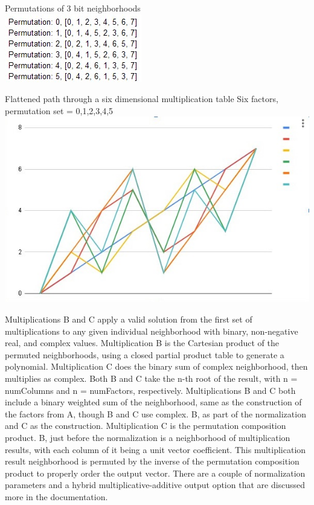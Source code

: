 \documentclass[11pt]{article}
\begin{document}
\begin{center}
Permutations of 3 bit neighborhoods\\
\includegraphics{bitPermutations.jpg}

Flattened path through a six dimensional multiplication table
Six factors, permutation set = {0,1,2,3,4,5}\\
\includegraphics{flattenedSixCube.jpg}
\end{center}

Multiplications B and C apply a valid solution from the first set of multiplications to any given individual neighborhood with binary, non-negative real, and complex values. Multiplication B is the Cartesian product of the permuted neighborhoods, using a closed partial product table to generate a polynomial. Multiplication C does the binary sum of complex neighborhood, then multiplies as complex. Both B and C take the n-th root of the result, with n = numColumns and n = numFactors, respectively. Multiplications B and C both include a binary weighted sum of the neighborhood, same as the construction of the factors from A, though B and C use complex. B, as part of the normalization and C as the construction. Multiplication C is the permutation composition product. B, just before the normalization is a neighborhood of multiplication results, with each column of it being a unit vector coefficient. This multiplication result neighborhood is permuted by the inverse of the permutation composition product to properly order the output vector. There are a couple of normalization parameters and a hybrid multiplicative-additive output option that are discussed more in the documentation.
\end{document}
